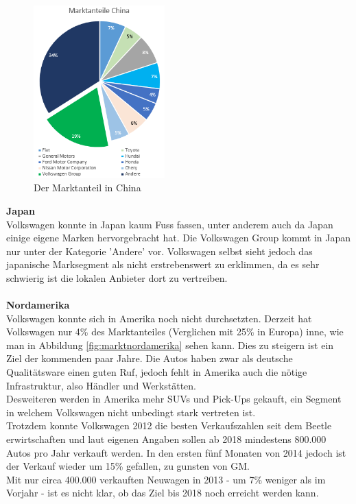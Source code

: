 \documentclass[12pt]{article}
\begin{document}
\begin{figure}[here!]
\centering
\includegraphics[width=0.45\textwidth]{images/mach}
\caption{Der Marktanteil in China}
\label{fig:marktchina}
\end{figure}\FloatBarrier
\noindent
\textbf{Japan} \\
Volkswagen konnte in Japan kaum Fuss fassen, unter anderem auch da Japan einige eigene Marken hervorgebracht hat.  Die Volkswagen Group kommt in Japan nur unter der Kategorie 'Andere' vor. Volkswagen selbst sieht jedoch das japanische Marksegment als nicht erstrebenswert zu erklimmen, da es sehr schwierig ist die lokalen Anbieter dort zu vertreiben.
\\\\
\textbf{Nordamerika}\\
Volkswagen konnte sich in Amerika noch nicht durchsetzten. Derzeit hat Volkswagen nur 4\% des Marktanteiles (Verglichen mit 25\% in Europa) inne, wie man in Abbildung \ref{fig:marktnordamerika} sehen kann. Dies zu steigern ist ein Ziel der kommenden paar Jahre. Die Autos haben zwar als deutsche Qualitätsware einen guten Ruf, jedoch fehlt in Amerika auch die nötige Infrastruktur, also Händler und Werkstätten. \\ Desweiteren werden in Amerika mehr SUVs und Pick-Ups gekauft, ein Segment in welchem Volkswagen nicht unbedingt stark vertreten ist.\\
Trotzdem konnte Volkswagen 2012 die besten Verkaufszahlen seit dem Beetle erwirtschaften und laut eigenen Angaben sollen ab 2018 mindestens 800.000 Autos pro Jahr verkauft werden. In den ersten fünf Monaten von 2014 jedoch ist der Verkauf wieder um 15\% gefallen, zu gunsten von GM. \\
Mit nur circa 400.000 verkauften Neuwagen in 2013 - um 7\% weniger als im Vorjahr - ist es nicht klar, ob das Ziel bis 2018 noch erreicht werden kann.\cite{ec1}\\
\end{document}
